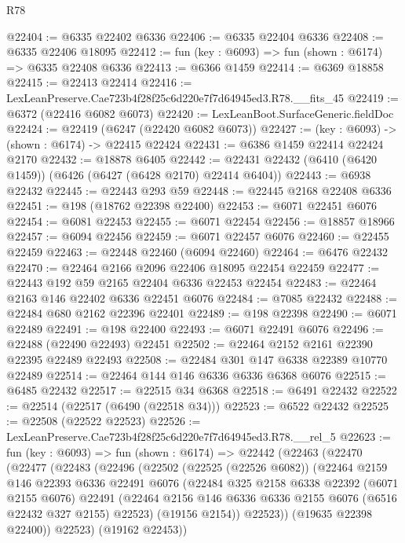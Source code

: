 \begin{lexlean}{R78}
\begin{coremodule}
@22404 := @6335 @22402 @6336
@22406 := @6335 @22404 @6336
@22408 := @6335 @22406 @18095
@22412 := fun (key : @6093) => fun (shown : @6174) => @6335 @22408 @6336
@22413 := @6366 @1459
@22414 := @6369 @18858
@22415 := @22413 @22414
@22416 := LexLeanPreserve.Cae723b4f28f25c6d220e7f7d64945ed3.R78.__fits_45
@22419 := @6372 (@22416 @6082 @6073)
@22420 := LexLeanBoot.SurfaceGeneric.fieldDoc
@22424 := @22419 (@6247 (@22420 @6082 @6073))
@22427 := (key : @6093) -> (shown : @6174) -> @22415 @22424
@22431 := @6386 @1459 @22414 @22424 @2170
@22432 := @18878 @6405
@22442 := @22431 @22432 (@6410 (@6420 @1459)) (@6426 (@6427 (@6428 @2170) @22414 @6404))
@22443 := @6938 @22432
@22445 := @22443 @293 @59
@22448 := @22445 @2168 @22408 @6336
@22451 := @198 (@18762 @22398 @22400)
@22453 := @6071 @22451 @6076
@22454 := @6081 @22453
@22455 := @6071 @22454
@22456 := @18857 @18966
@22457 := @6094 @22456
@22459 := @6071 @22457 @6076
@22460 := @22455 @22459
@22463 := @22448 @22460 (@6094 @22460)
@22464 := @6476 @22432
@22470 := @22464 @2166 @2096 @22406 @18095 @22454 @22459
@22477 := @22443 @192 @59 @2165 @22404 @6336 @22453 @22454
@22483 := @22464 @2163 @146 @22402 @6336 @22451 @6076
@22484 := @7085 @22432
@22488 := @22484 @680 @2162 @22396 @22401
@22489 := @198 @22398
@22490 := @6071 @22489
@22491 := @198 @22400
@22493 := @6071 @22491 @6076
@22496 := @22488 (@22490 @22493) @22451
@22502 := @22464 @2152 @2161 @22390 @22395 @22489 @22493
@22508 := @22484 @301 @147 @6338 @22389 @10770 @22489
@22514 := @22464 @144 @146 @6336 @6336 @6368 @6076
@22515 := @6485 @22432
@22517 := @22515 @34 @6368
@22518 := @6491 @22432
@22522 := @22514 (@22517 (@6490 (@22518 @34)))
@22523 := @6522 @22432
@22525 := @22508 (@22522 @22523)
@22526 := LexLeanPreserve.Cae723b4f28f25c6d220e7f7d64945ed3.R78.__rel_5
@22623 := fun (key : @6093) =>
  fun (shown : @6174) =>
  @22442
    (@22463
      (@22470
        (@22477
          (@22483
            (@22496
              (@22502
                (@22525 (@22526 @6082))
                (@22464
                  @2159
                  @146
                  @22393
                  @6336
                  @22491
                  @6076
                  (@22484
                    @325
                    @2158
                    @6338
                    @22392
                    (@6071 @2155 @6076)
                    @22491
                    (@22464 @2156 @146 @6336 @6336 @2155 @6076 (@6516 @22432 @327 @2155) @22523)
                    (@19156 @2154))
                  @22523))
              (@19635 @22398 @22400))
            @22523)
          (@19162 @22453))

\end{coremodule}
\end{lexlean}
